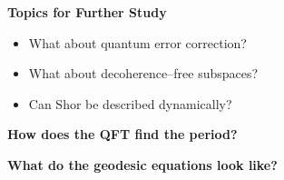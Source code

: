 \documentclass{slides}
\begin{document}
\begin{center}
\end{center}


\pagebreak


\begin{center}
\textbf{Topics for Further Study}
\end{center}

\begin{itemize}
\item What about quantum error correction?
\item What about decoherence--free subspaces?
\item Can Shor be described dynamically?
\end{itemize}

\pagebreak



\begin{center}
\textbf{How does the QFT find the period?}
\end{center}

\pagebreak


\begin{center}
\textbf{What do the geodesic equations look like?}
\end{center}
\end{document}
